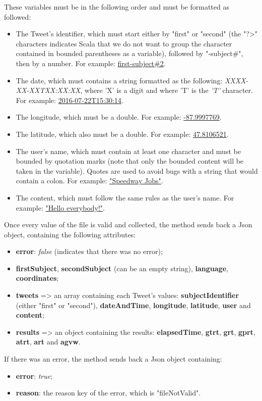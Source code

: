 \documentclass[a4paper,11pt]{report}
\begin{document}
These variables must be in the following order and must be formatted as followed:
\begin{itemize}
	\item The Tweet's identifier, which must start either by "first" or "second" (the "?>" characters indicates Scala that we do not want to group the character contained in bounded parentheses as a variable), followed by "-subject\#", then by a number. For example: \underline{first-subject\#2}.
	\item The date, which must contains a string formatted as the following: \emph{XXXX-XX-XXTXX:XX:XX}, where 'X' is a digit and where 'T' is the \emph{'T'} character. For example: \underline{2016-07-22T15:30:14}.
	\item The longitude, which must be a double. For example: \underline{-87.9997769}.
	\item The latitude, which also must be a double. For example: \underline{47.8106521}.
	\item The user's name, which must contain at least one character and must be bounded by quotation marks (note that only the bounded content will be taken in the variable). Quotes are used to avoid bugs with a string that would contain a colon. For example: \underline{"Speedway Jobs"}.
	\item The content, which must follow the same rules as the user's name. For example: \underline{"Hello everybody!"}.
\end{itemize}

Once every value of the file is valid and collected, the method sends back a Json object, containing the following attributes:
\begin{itemize}
	\item \textbf{error}: \emph{false} (indicates that there was no error);
	\item \textbf{firstSubject}, \textbf{secondSubject} (can be an empty string), \textbf{language}, \textbf{coordinates};
	\item \textbf{tweets} => an array containing each Tweet's values: \textbf{subjectIdentifier} (either "first" or "second"), \textbf{dateAndTime}, \textbf{longitude}, \textbf{latitude}, \textbf{user} and \textbf{content};
	\item \textbf{results} => an object containing the results: \textbf{elapsedTime}, \textbf{gtrt}, \textbf{grt}, \textbf{gprt}, \textbf{atrt}, \textbf{art} and \textbf{agvw}.
\end{itemize}

If there was an error, the method sends back a Json object containing:
\begin{itemize}
	\item \textbf{error}: \emph{true};
	\item \textbf{reason}: the reason key of the error, which is "fileNotValid".
\end{itemize}
\end{document}
